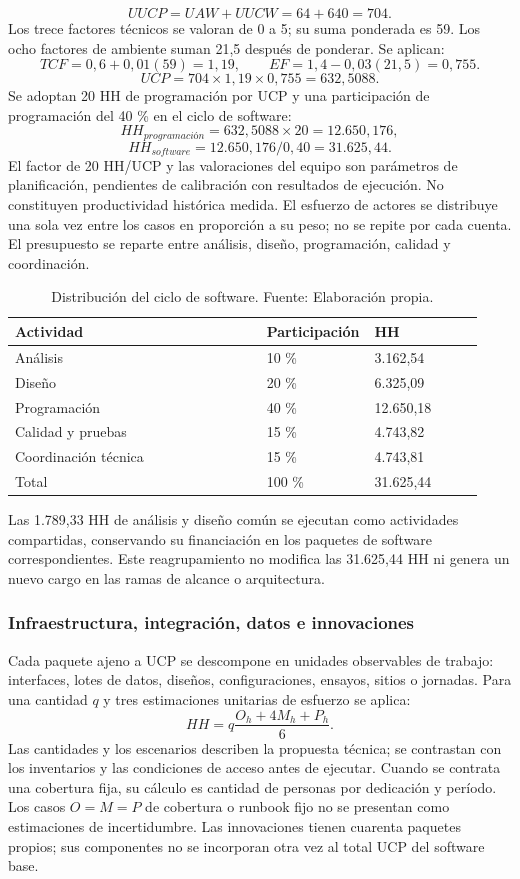 \documentclass[11pt]{article}
\begin{document}
\[
UUCP=UAW+UUCW=64+640=704.
\]
Los trece factores técnicos se valoran de 0 a 5; su suma ponderada es 59. Los ocho factores de ambiente suman 21,5 después de ponderar. Se aplican:
\[
TCF=0{,}6+0{,}01(59)=1{,}19,\qquad
EF=1{,}4-0{,}03(21{,}5)=0{,}755.
\]
\[
UCP=704\times1{,}19\times0{,}755=632{,}5088.
\]
Se adoptan 20 HH de programación por UCP y una participación de programación del 40 \% en el ciclo de software:
\[
HH_{programación}=632{,}5088\times20=12.650{,}176,
\]
\[
HH_{software}=12.650{,}176/0{,}40=31.625{,}44.
\]
El factor de 20 HH/UCP y las valoraciones del equipo son parámetros de planificación, pendientes de calibración con resultados de ejecución. No constituyen productividad histórica medida. El esfuerzo de actores se distribuye una sola vez entre los casos en proporción a su peso; no se repite por cada cuenta. El presupuesto se reparte entre análisis, diseño, programación, calidad y coordinación.

\begingroup
\small
\begin{longtable}{@{}p{0.53\linewidth}p{0.17\linewidth}p{0.23\linewidth}@{}}
\caption[Distribución del ciclo de software]{Distribución del ciclo de software. Fuente: Elaboración propia.}\label{tab:t15-1}\\
\toprule
\textbf{Actividad} & \textbf{Participación} & \textbf{HH} \\
\midrule
\endhead
\bottomrule
\endlastfoot
Análisis & 10 \% & 3.162,54 \\
Diseño & 20 \% & 6.325,09 \\
Programación & 40 \% & 12.650,18 \\
Calidad y pruebas & 15 \% & 4.743,82 \\
Coordinación técnica & 15 \% & 4.743,81 \\
Total & 100 \% & 31.625,44 \\
\end{longtable}
\endgroup

Las 1.789,33 HH de análisis y diseño común se ejecutan como actividades compartidas, conservando su financiación en los paquetes de software correspondientes. Este reagrupamiento no modifica las 31.625,44 HH ni genera un nuevo cargo en las ramas de alcance o arquitectura.

\subsubsection{Infraestructura, integración, datos e innovaciones}

Cada paquete ajeno a UCP se descompone en unidades observables de trabajo: interfaces, lotes de datos, diseños, configuraciones, ensayos, sitios o jornadas. Para una cantidad $q$ y tres estimaciones unitarias de esfuerzo se aplica:
\[
HH=q\frac{O_h+4M_h+P_h}{6}.
\]
Las cantidades y los escenarios describen la propuesta técnica; se contrastan con los inventarios y las condiciones de acceso antes de ejecutar. Cuando se contrata una cobertura fija, su cálculo es cantidad de personas por dedicación y período. Los casos $O=M=P$ de cobertura o runbook fijo no se presentan como estimaciones de incertidumbre. Las innovaciones tienen cuarenta paquetes propios; sus componentes no se incorporan otra vez al total UCP del software base.
\end{document}
